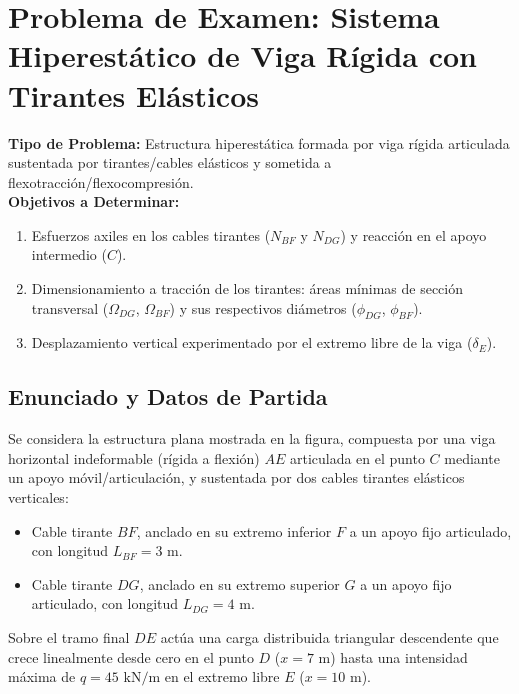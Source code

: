 \section{Problema de Examen: Sistema Hiperestático de Viga Rígida con Tirantes Elásticos}

\begin{tcolorbox}[colback=white, colframe=myb!80!black, arc=4pt, boxrule=0.9pt, left=8pt, right=8pt, top=7pt, bottom=7pt]
    \textbf{Tipo de Problema:} Estructura hiperestática formada por viga rígida articulada sustentada por tirantes/cables elásticos y sometida a flexotracción/flexocompresión.\\
    \textbf{Objetivos a Determinar:}
    \begin{enumerate}
        \item Esfuerzos axiles en los cables tirantes ($N_{BF}$ y $N_{DG}$) y reacción en el apoyo intermedio ($C$).
        \item Dimensionamiento a tracción de los tirantes: áreas mínimas de sección transversal ($\Omega_{DG}$, $\Omega_{BF}$) y sus respectivos diámetros ($\phi_{DG}$, $\phi_{BF}$).
        \item Desplazamiento vertical experimentado por el extremo libre de la viga ($\delta_E$).
    \end{enumerate}
\end{tcolorbox}

\subsection{Enunciado y Datos de Partida}

Se considera la estructura plana mostrada en la figura, compuesta por una viga horizontal indeformable (rígida a flexión) $AE$ articulada en el punto $C$ mediante un apoyo móvil/articulación, y sustentada por dos cables tirantes elásticos verticales:
\begin{itemize}
    \item Cable tirante $BF$, anclado en su extremo inferior $F$ a un apoyo fijo articulado, con longitud $L_{BF} = 3\text{ m}$.
    \item Cable tirante $DG$, anclado en su extremo superior $G$ a un apoyo fijo articulado, con longitud $L_{DG} = 4\text{ m}$.
\end{itemize}

Sobre el tramo final $DE$ actúa una carga distribuida triangular descendente que crece linealmente desde cero en el punto $D$ ($x = 7\text{ m}$) hasta una intensidad máxima de $q = 45\text{ kN/m}$ en el extremo libre $E$ ($x = 10\text{ m}$).

